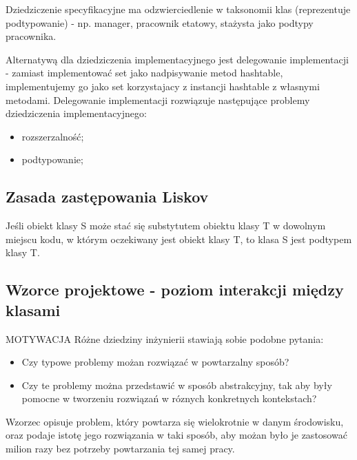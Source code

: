 \documentclass[a4paper]{article}
\begin{document}
Dziedziczenie specyfikacyjne ma odzwierciedlenie w
taksonomii klas (reprezentuje podtypowanie) - np. manager, pracownik etatowy, stażysta jako podtypy pracownika.

Alternatywą dla dziedziczenia implementacyjnego jest
delegowanie implementacji - zamiast implementować set jako nadpisywanie metod hashtable, implementujemy go jako set korzystajacy z instancji hashtable z własnymi metodami.
Delegowanie implementacji rozwiązuje
następujące problemy dziedziczenia
implementacyjnego:
\begin{itemize}
    \item rozszerzalność;
    \item podtypowanie;
\end{itemize}

\subsection{Zasada zastępowania Liskov}
    Jeśli obiekt klasy S może stać się substytutem obiektu klasy T w
    dowolnym miejscu kodu, w którym oczekiwany jest obiekt klasy T, to klasa S jest
    podtypem klasy T.

\subsection{Wzorce projektowe - poziom interakcji między klasami}
MOTYWACJA
    Różne dziedziny inżynierii stawiają sobie podobne pytania:
    \begin{itemize}
        \item Czy typowe problemy możan rozwiązać w powtarzalny sposób?
        \item Czy te problemy można przedstawić w sposób abstrakcyjny, tak aby były pomocne
        w tworzeniu rozwiązań w róznych konkretnych kontekstach?
    \end{itemize}

Wzorzec opisuje problem, który powtarza się wielokrotnie w danym środowisku, oraz podaje istotę
jego rozwiązania w taki sposób, aby możan było je zastosować milion razy bez potrzeby powtarzania
tej samej pracy.
\end{document}
